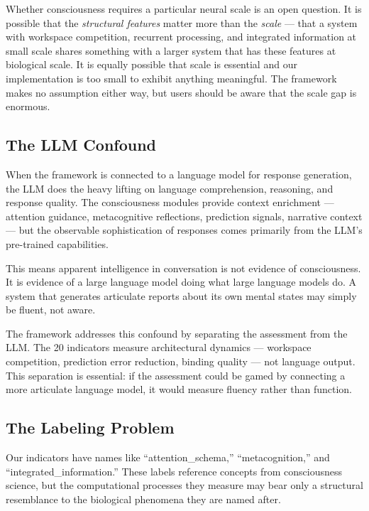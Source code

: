 Whether consciousness requires a particular neural scale is an open question. It is possible that the \textit{structural features} matter more than the \textit{scale} --- that a system with workspace competition, recurrent processing, and integrated information at small scale shares something with a larger system that has these features at biological scale. It is equally possible that scale is essential and our implementation is too small to exhibit anything meaningful. The framework makes no assumption either way, but users should be aware that the scale gap is enormous.

\subsection{The LLM Confound}

When the framework is connected to a language model for response generation, the LLM does the heavy lifting on language comprehension, reasoning, and response quality. The consciousness modules provide context enrichment --- attention guidance, metacognitive reflections, prediction signals, narrative context --- but the observable sophistication of responses comes primarily from the LLM's pre-trained capabilities.

This means apparent intelligence in conversation is not evidence of consciousness. It is evidence of a large language model doing what large language models do. A system that generates articulate reports about its own mental states may simply be fluent, not aware.

The framework addresses this confound by separating the assessment from the LLM. The 20 indicators measure architectural dynamics --- workspace competition, prediction error reduction, binding quality --- not language output. This separation is essential: if the assessment could be gamed by connecting a more articulate language model, it would measure fluency rather than function.

\subsection{The Labeling Problem}

Our indicators have names like ``attention\_schema,'' ``metacognition,'' and ``integrated\_information.'' These labels reference concepts from consciousness science, but the computational processes they measure may bear only a structural resemblance to the biological phenomena they are named after.

